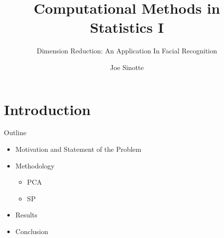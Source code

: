 \documentclass[pdf]{beamer}
\title{Computational Methods in Statistics I}
\subtitle{Dimension Reduction: An Application In Facial Recognition}
\author{Joe Sinotte}
\begin{document}
\begin{frame}
\titlepage
\end{frame}

\section{Introduction}
\begin{frame}{Outline}
\begin{itemize}
\item Motivation and Statement of the Problem
\item Methodology
\begin{itemize}
\item PCA
\item SP
\end{itemize}
\item Results
\item Conclusion
\end{itemize}

\end{frame}
\end{document}
